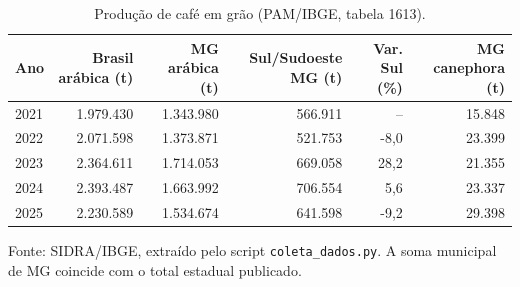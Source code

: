 \begin{table}[htbp]
\centering
\small
\caption{Produção de café em grão (PAM/IBGE, tabela 1613).}
\label{tab:producao_anual}
\begin{tabular}{lrrrrr}
\toprule
Ano & Brasil arábica (t) & MG arábica (t) & Sul/Sudoeste MG (t) & Var. Sul (\%) & MG canephora (t) \\
\midrule
2021 & 1.979.430 & 1.343.980 & 566.911 & -- & 15.848 \\
2022 & 2.071.598 & 1.373.871 & 521.753 & -8,0 & 23.399 \\
2023 & 2.364.611 & 1.714.053 & 669.058 & 28,2 & 21.355 \\
2024 & 2.393.487 & 1.663.992 & 706.554 & 5,6 & 23.337 \\
2025 & 2.230.589 & 1.534.674 & 641.598 & -9,2 & 29.398 \\
\bottomrule
\end{tabular}
\par\smallskip\footnotesize\raggedright Fonte: SIDRA/IBGE, extraído pelo script \texttt{coleta\_dados.py}. A soma municipal de MG coincide com o total estadual publicado.
\end{table}
